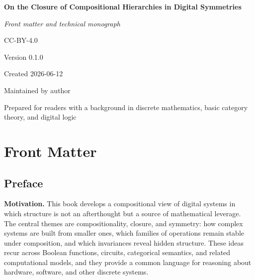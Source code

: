 \documentclass[11pt]{article}
\begin{document}
\cleardoublepage
\thispagestyle{empty}
\begin{titlepage}
\centering
\vspace*{0.18\textheight}

{\Huge\bfseries On the Closure of Compositional Hierarchies in Digital Symmetries\par}
\vspace{1.05em}
{\Large\itshape Front matter and technical monograph\par}
\vspace{1.8em}

{\large CC-BY-4.0\par}
\vspace{0.8em}
{\large Version 0.1.0\par}
\vspace{0.8em}
{\large Created 2026-06-12\par}
\vspace{0.8em}
{\large Maintained by author\par}

\vfill

{\large Prepared for readers with a background in discrete mathematics, basic category theory,
and digital logic\par}

\vspace*{0.12\textheight}
\end{titlepage}



\section{Front Matter}

\subsection{Preface}


\noindent\textbf{Motivation.} This book develops a compositional view of digital systems in which structure is not an afterthought but a source of mathematical leverage. The central themes are compositionality, closure, and symmetry: how complex systems are built from smaller ones, which families of operations remain stable under composition, and which invariances reveal hidden structure. These ideas recur across Boolean functions, circuits, categorical semantics, and related computational models, and they provide a common language for reasoning about hardware, software, and other discrete systems.
\end{document}
